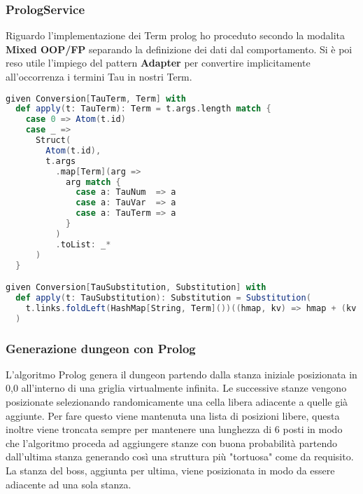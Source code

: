 \subsubsection{PrologService}
Riguardo l'implementazione dei Term prolog ho proceduto secondo la modalita \textbf{Mixed OOP/FP} separando la definizione dei dati dal comportamento. Si è poi reso utile l'impiego del pattern \textbf{Adapter} per convertire implicitamente all'occorrenza i termini Tau in nostri Term.
\begin{lstlisting}[language=Scala]
given Conversion[TauTerm, Term] with
  def apply(t: TauTerm): Term = t.args.length match {
    case 0 => Atom(t.id)
    case _ =>
      Struct(
        Atom(t.id),
        t.args
          .map[Term](arg =>
            arg match {
              case a: TauNum  => a
              case a: TauVar  => a
              case a: TauTerm => a
            }
          )
          .toList: _*
      )
  }

given Conversion[TauSubstitution, Substitution] with
  def apply(t: TauSubstitution): Substitution = Substitution(
    t.links.foldLeft(HashMap[String, Term]())((hmap, kv) => hmap + (kv._1 -> kv._2))
  )
\end{lstlisting} 

\subsubsection{Generazione dungeon con Prolog}
L'algoritmo Prolog genera il dungeon partendo dalla stanza iniziale posizionata in 0,0 all'interno di una griglia virtualmente infinita. 
Le successive stanze vengono posizionate selezionando randomicamente una cella libera adiacente a quelle già aggiunte. 
Per fare questo viene mantenuta una lista di posizioni libere, questa inoltre viene troncata sempre per mantenere una lunghezza di 6 posti in modo che l'algoritmo proceda ad aggiungere stanze con buona probabilità partendo dall'ultima stanza generando così una struttura più "tortuosa" come da requisito.
La stanza del boss, aggiunta per ultima, viene posizionata in modo da essere adiacente ad una sola stanza.